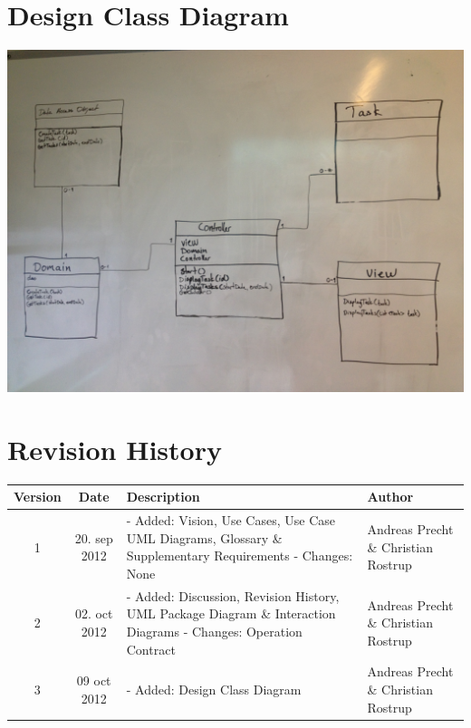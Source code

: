 \documentclass[a4paper, 10pt]{article}
\begin{document}
\section{Design Class Diagram}
\includegraphics[width=\linewidth]{../Pictures/Design_Class_Diagram.jpg}

\section{Revision History}
\begin{tabular}{ | c | c | p{6cm} | p{3cm} | }
\hline
\textbf{Version} & \textbf{Date} & \textbf{Description} & \textbf{Author}
\\ \hline
1 & 20. sep 2012 & - Added: Vision, Use Cases, Use Case UML Diagrams, Glossary \& Supplementary Requirements - Changes: None & Andreas Precht \& Christian Rostrup
\\ \hline
2 & 02. oct 2012 & - Added: Discussion, Revision History, UML Package Diagram \& Interaction Diagrams - Changes: Operation Contract& Andreas Precht \& Christian Rostrup
\\ \hline
3 & 09 oct 2012 & - Added: Design Class Diagram & Andreas Precht \& Christian Rostrup
\end{tabular}
\end{document}
